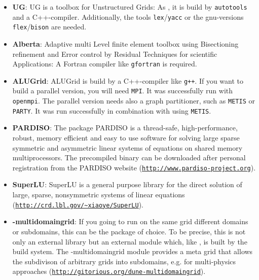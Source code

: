 \begin{itemize}
\item \textbf{UG}: UG is a toolbox for Unstructured Grids: As \Dumux, it is build by \texttt{autotools} and a C++-compiler. Additionally, the tools \texttt{lex}/\texttt{yacc} or the gnu-versions \texttt{flex}/\texttt{bison} are needed. 

\item \textbf{Alberta}: Adaptive multi Level finite element toolbox using Bisectioning refinement and Error control by Residual Techniques for scientific Applications: A Fortran compiler like \texttt{gfortran} is required.

\item \textbf{ALUGrid}: ALUGrid is build by a C++-compiler like \texttt{g++}. If you want to build a parallel version, you will need \texttt{MPI}. It was successfully run with \texttt{openmpi}. The parallel version needs also a graph partitioner, such as \texttt{METIS} or \texttt{PARTY}. It was run successfully in combination with \Dune using \texttt{METIS}.

\item \textbf{PARDISO}: The package PARDISO is a thread-safe, high-performance, robust, memory efficient and easy to use software for solving large sparse symmetric and asymmetric linear systems of equations on shared memory multiprocessors. The precompiled binary can be downloaded after personal registration from the PARDISO website (\texttt{\url{http://www.pardiso-project.org}}).

\item \textbf{SuperLU}: SuperLU is a general purpose library for the direct solution of large, sparse, nonsymmetric systems of linear equations (\texttt{\url{http://crd.lbl.gov/~xiaoye/SuperLU}}).

\item \textbf{\Dune-multidomaingrid}: If you going to run on the same grid different domains or subdomains, this can be the package of choice. 
To be precise, this is not only an external library but an external \Dune module which, like \Dumux, is built by the \Dune build system. The \Dune-multidomaingrid module provides a meta grid that allows the subdivison of arbitrary \Dune grids into subdomains, e.g. for multi-physics approaches (\texttt{\url{http://gitorious.org/dune-multidomaingrid}}).
\end{itemize}

